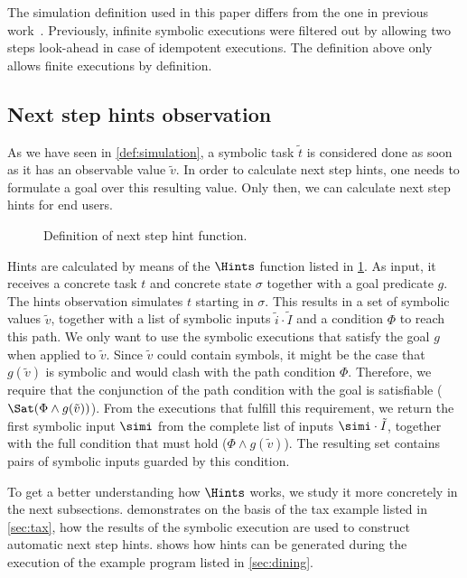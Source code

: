 The simulation definition used in this paper differs from the one in previous work~\cite{Naus2019}.
Previously, infinite symbolic executions were filtered out by allowing two steps look-ahead in case of idempotent executions.
The definition above only allows finite executions by definition.

\subsection{Next step hints observation}
\label{sub:hints}

As we have seen in \cref{def:simulation}, a symbolic task $\tilde{t}$ is considered done as soon as it has an observable value $\tilde{v}$.
In order to calculate next step hints, one needs to formulate a goal over this resulting value.
Only then, we can calculate next step hints for end users.

\begin{figure}
  \centering
  \caption{Definition of next step hint function.}
  \label{fig:hints}
\end{figure}

Hints are calculated by means of the $\Hints$ function listed in \cref{fig:hints}.
As input, it receives a concrete task $t$ and concrete state $\sigma$ together with a goal predicate $g$.
The hints observation simulates $t$ starting in $\sigma$.
This results in a set of symbolic values $\tilde{v}$, together with a list of symbolic inputs $\tilde{i}\cdot\tilde{I}$ and a condition $\Phi$ to reach this path.
We only want to use the symbolic executions that satisfy the goal $g$ when applied to $\tilde{v}$.
Since $\tilde{v}$ could contain symbols, it might be the case that $g(\tilde{v})$ is symbolic and would clash with the path condition $\Phi$.
Therefore, we require that the conjunction of the path condition with the goal is satisfiable ($\Sat(\Phi\land g(\tilde{v}))$).
From the executions that fulfill this requirement, we return the first symbolic input $\simi$ from the complete list of inputs $\simi\cdot\tilde{I}$,
together with the full condition that must hold ($\Phi\land g(\tilde{v})$).
The resulting set contains pairs of symbolic inputs guarded by this condition.

To get a better understanding how $\Hints$ works,
we study it more concretely in the next subsections.
 demonstrates on the basis of the tax example listed in \cref{sec:tax}, how the results of the symbolic execution are used to construct automatic next step hints.
 shows how hints can be generated during the execution of the example \TOPHAT program listed in \cref{sec:dining}.


